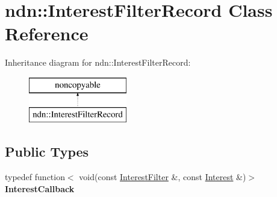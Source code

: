 \hypertarget{classndn_1_1InterestFilterRecord}{}\section{ndn\+:\+:Interest\+Filter\+Record Class Reference}
\label{classndn_1_1InterestFilterRecord}
Inheritance diagram for ndn\+:\+:Interest\+Filter\+Record\+:\begin{figure}[H]
\begin{center}
\leavevmode
\includegraphics[height=2.000000cm]{classndn_1_1InterestFilterRecord}
\end{center}
\end{figure}
\subsection*{Public Types}
\begin{DoxyCompactItemize}
\item 
typedef function$<$ void(const \hyperlink{classndn_1_1InterestFilter}{Interest\+Filter} \&, const \hyperlink{classndn_1_1Interest}{Interest} \&)$>$ {\bfseries Interest\+Callback}\hypertarget{classndn_1_1InterestFilterRecord_acfa2e872886a7d6c265df5320af5b88d}{}\label{classndn_1_1InterestFilterRecord_acfa2e872886a7d6c265df5320af5b88d}

\end{DoxyCompactItemize}

